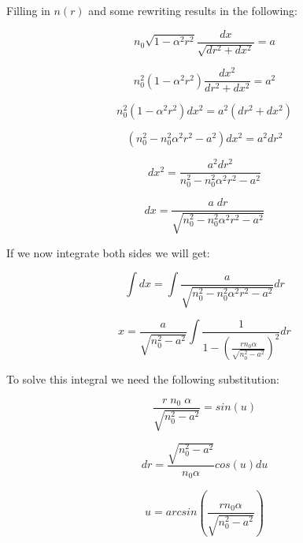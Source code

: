\documentclass{article}
\begin{document}
Filling in $n(r)$ and some rewriting results in the following:

\begin{equation*}
	n_0 \sqrt{1 - \alpha ^2 r^2}  \frac{dx}{\sqrt{dr^2 + dx^2}} = a
\end{equation*}

\begin{equation*}
	n_0^2 (1 - \alpha ^2 r^2)  \frac{dx^2}{dr^2 + dx^2} = a^2
\end{equation*}

\begin{equation*}
	n_0^2 (1 - \alpha ^2 r^2)  dx^2 = a^2 (dr^2 + dx^2)
\end{equation*}

\begin{equation*}
	(n_0 ^2 - n_0^2 \alpha ^2 r^2 - a^2)  dx^2 = a^2 dr^2
\end{equation*}

\begin{equation*}
	dx^2 =\frac{a^2 dr^2}{n_0 ^2 - n_0^2 \alpha ^2 r^2 - a^2}
\end{equation*}

\begin{equation}
	dx =\frac{a \; dr}{\sqrt{n_0 ^2 - n_0^2 \alpha ^2 r^2 - a^2}}
	\label{eq:drdx}
\end{equation}


If we now integrate both sides we will get:

\begin{equation*}
	\int dx = \int \frac{a}{\sqrt{n_0 ^2 - n_0^2 \alpha ^2 r^2 - a^2}} dr
\end{equation*}

\begin{equation*}
	x = \frac{a}{\sqrt{n_0^2 - a^2}} \int \frac{1}{1 - \left( \frac{r n_0 \alpha}{\sqrt{n_0^2-a^2}} \right) ^2} dr
\end{equation*}

To solve this integral we need the following substitution:

\begin{equation*}
	 \frac{r \; n_0 \; \alpha}{\sqrt{n_0^2-a^2}} = sin(u)
\end{equation*}

\begin{equation*}
	 dr = \frac{\sqrt{n_0^2-a^2}}{n_0 \alpha} cos(u) du
\end{equation*}

\begin{equation*}
	 u = arcsin \left( \frac{r n_0 \alpha}{\sqrt{n_0^2-a^2}} \right)
\end{equation*}
\end{document}
